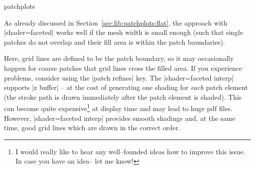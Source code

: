 \begin{pgfplotslibrary}{patchplots}
\begin{codeexample}[]
\end{codeexample}
\noindent As already discussed in Section~\ref{sec:lib:patchplots:flat}, the approach with |shader=faceted| works well if the mesh width is small enough (such that single patches do not overlap and their fill area is within the patch boundaries).
%
\begin{codeexample}[]
\end{codeexample}
\noindent Here, grid lines are defined to be the patch boundary, so it may occasionally happen for coarse patches that grid lines cross the filled area. If you experience problems, consider using the |patch refines| key. The |shader=faceted interp| supports |z buffer| -- at the cost of generating one shading for \emph{each} patch element (the stroke path is drawn immediately after the patch element is shaded). This can become quite expensive\footnote{I would really like to hear any well--founded ideas how to improve this issue. In case you have an idea-- let me know!} at display time and may lead to huge pdf files. However, |shader=faceted interp| provides smooth shadings and, at the same time, good  grid lines which are drawn in the correct order. 

%
\begin{codeexample}[]
\begin{tikzpicture}
\begin{axis}[
	title={Mesh on top of patches (i): obscured}]


\end{axis}
\end{tikzpicture}
\end{codeexample}
\end{pgfplotslibrary}
